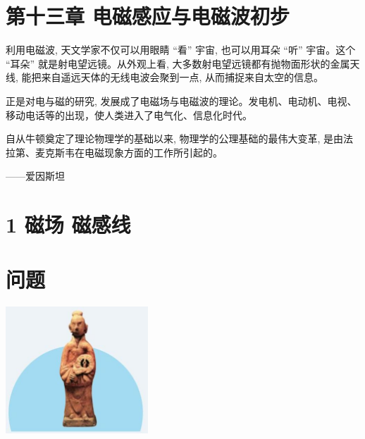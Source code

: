 \documentclass[10pt]{article}
\begin{document}
\begin{center}
\end{center}

\section*{第十三章 电磁感应与电磁波初步}

利用电磁波, 天文学家不仅可以用眼睛 “看” 宇宙, 也可以用耳朵 “听” 宇宙。这个 “耳朵” 就是射电望远镜。从外观上看, 大多数射电望远镜都有抛物面形状的金属天线, 能把来自遥远天体的无线电波会聚到一点, 从而捕捉来自太空的信息。

正是对电与磁的研究, 发展成了电磁场与电磁波的理论。发电机、电动机、电视、移动电话等的出现，使人类进入了电气化、信息化时代。

自从牛顿奠定了理论物理学的基础以来, 物理学的公理基础的最伟大变革, 是由法拉第、麦克斯韦在电磁现象方面的工作所引起的。

——爱因斯坦

\section*{1 磁场 磁感线}

\section*{问题}

\begin{center}
\includegraphics[max width=0.4\textwidth]{images/01911d5f-8e38-70c0-b5b8-2b399bd115b6_109_461390.jpg}
\end{center}
\end{document}
